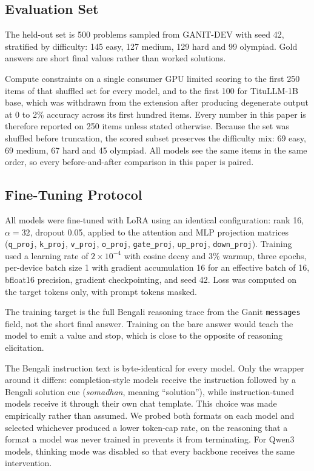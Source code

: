 \documentclass[10pt,twocolumn,letterpaper]{article}
\begin{document}
\subsection{Evaluation Set}

The held-out set is 500 problems sampled from GANIT-DEV with seed 42,
stratified by difficulty: 145 easy, 127 medium, 129 hard and 99 olympiad. Gold
answers are short final values rather than worked solutions.

Compute constraints on a single consumer GPU limited scoring to the first 250
items of that shuffled set for every model, and to the first 100 for TituLLM-1B
base, which was withdrawn from the extension after producing degenerate output
at 0 to 2\% accuracy across its first hundred items. Every number in this paper
is therefore reported on 250 items unless stated otherwise. Because the set was
shuffled before truncation, the scored subset preserves the difficulty mix: 69
easy, 69 medium, 67 hard and 45 olympiad. All models see the same items in the
same order, so every before-and-after comparison in this paper is paired.

\subsection{Fine-Tuning Protocol}

All models were fine-tuned with LoRA \parencite{hu2021lora} using an identical
configuration: rank 16, $\alpha=32$, dropout 0.05, applied to the attention and
MLP projection matrices (\texttt{q\_proj}, \texttt{k\_proj}, \texttt{v\_proj},
\texttt{o\_proj}, \texttt{gate\_proj}, \texttt{up\_proj}, \texttt{down\_proj}).
Training used a learning rate of $2\times10^{-4}$ with cosine decay and 3\%
warmup, three epochs, per-device batch size 1 with gradient accumulation 16 for
an effective batch of 16, bfloat16 precision, gradient checkpointing, and seed
42. Loss was computed on the target tokens only, with prompt tokens masked.

The training target is the full Bengali reasoning trace from the Ganit
\texttt{messages} field, not the short final answer. Training on the bare answer
would teach the model to emit a value and stop, which is close to the opposite
of reasoning elicitation.

The Bengali instruction text is byte-identical for every model. Only the wrapper
around it differs: completion-style models receive the instruction followed by a Bengali
solution cue (\emph{somadhan}, meaning ``solution''), while instruction-tuned
models receive it through their own chat template. This choice was made empirically rather than assumed. We probed
both formats on each model and selected whichever produced a lower token-cap
rate, on the reasoning that a format a model was never trained in prevents it
from terminating. For Qwen3 models, thinking mode was disabled so that every
backbone receives the same intervention.
\end{document}
